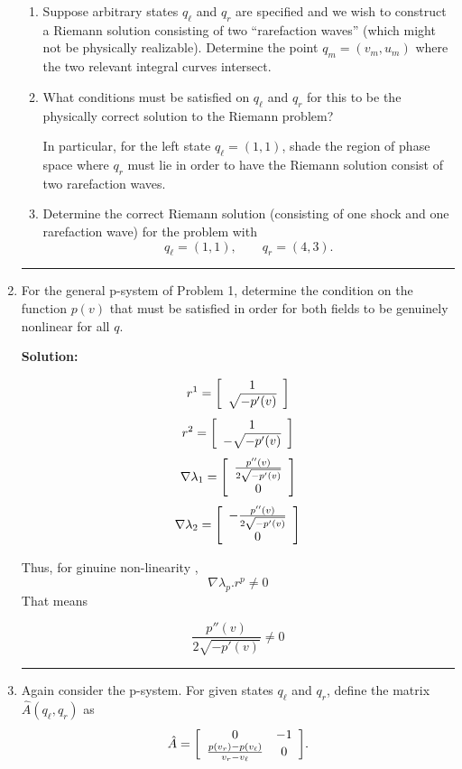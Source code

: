 \documentclass[11pt]{article}
\newenvironment{mat}{\left[ \begin{array}{ccccccccccccc}}{\end{array}\right]}
\newcommand\bcm{\begin{mat}}
\newcommand\ecm{\end{mat}}
\begin{document}
\begin{enumerate}
\begin{enumerate}
\item Suppose arbitrary states $q_\ell$ and $q_r$ are specified and we wish to
construct a Riemann solution consisting of two ``rarefaction waves'' (which
might not be physically realizable).   Determine the point $q_m =
(v_m,u_m)$ where the two relevant integral curves intersect.

\item What conditions must be satisfied on $q_\ell$ and $q_r$ for this to be
the physically correct solution to the Riemann problem?

In particular, for the left state $q_\ell = (1,1)$, 
shade the region of phase space where $q_r$ must lie in order to have the
Riemann solution consist of two rarefaction waves.


\item Determine the correct Riemann solution (consisting of one shock and
one rarefaction wave) for  the problem with
\[
q_\ell = (1,1), \qquad q_r = (4,3).
\]

\end{enumerate}



\vskip 1cm
\hrule
\item
For the general p-system of Problem 1,
determine the condition on the function $p(v)$
that must be satisfied in order for both fields to be genuinely nonlinear
for all $q$.

\vskip 1cm
{\bf Solution:}

 \[r^1 = \bcm 1\\  \sqrt{-p'(v)}\ecm \]
  \[r^2 = \bcm 1\\  -\sqrt{-p'(v)}\ecm \]
\[\nabla \lambda_1 = \bcm \frac{p''(v)}{2 \sqrt{- p'(v)} }\\  0\ecm  \]
\[\nabla \lambda_2 =   \bcm -\frac{p''(v)}{2 \sqrt{- p'(v)} }\\  0\ecm  \]

Thus, for ginuine non-linearity ,
 \[\nabla \lambda_p . r^p \neq 0 \]
 That means
 
 \[\frac{p''(v)}{2 \sqrt{- p'(v)} }\neq 0 \]
 
 
\vskip 1cm
\hrule
\item
Again consider the p-system.  For given states $q_\ell$ and $q_r$, 
define the matrix $\hat A(q_\ell,q_r)$ as
\[
\hat A = \bcm 0&-1\\ \frac{p(v_r)-p(v_\ell)}{v_r - v_\ell} & 0\ecm.
\]


\end{enumerate}
\end{document}
